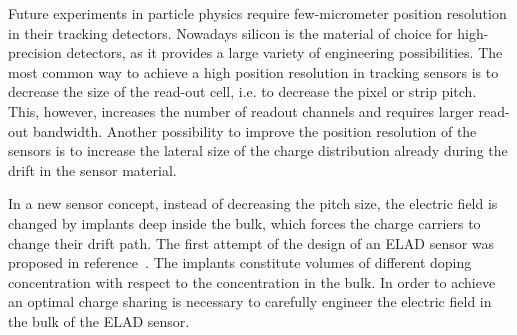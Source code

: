 
Future experiments in particle physics require few-micrometer position resolution in their tracking detectors. 
Nowadays silicon is the material of choice for high-precision detectors, as it provides a large variety of engineering possibilities. 
The most common way to achieve a high position resolution in tracking sensors is to decrease the size of the read-out cell, i.e. to decrease the pixel or strip pitch. 
This, however, increases the number of readout channels and requires larger read-out bandwidth. 
Another possibility to improve the position resolution of the sensors is to increase the lateral size of the charge distribution already during the drift in the sensor material. 

In a new sensor concept, instead of decreasing the pitch size, the electric field is changed by implants deep inside the bulk, which forces the charge carriers to change their drift path. 
The first attempt of the design of an ELAD sensor was proposed in reference~\cite{JANSEN2016242}.
The implants constitute volumes of different doping concentration with respect to the concentration in the bulk. 
In order to achieve an optimal charge sharing is necessary to carefully engineer the electric field in the bulk of the ELAD sensor. %
